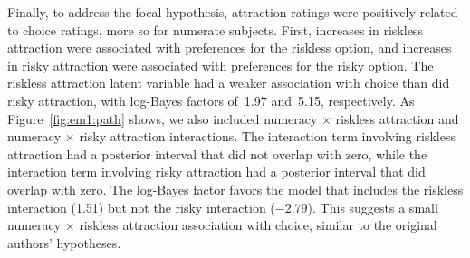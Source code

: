 Finally, to address the focal hypothesis, attraction ratings were positively related to choice ratings, more so for numerate subjects.   First, increases in riskless attraction were associated with preferences for the riskless option, and increases in risky attraction were associated with preferences for the risky option.  The riskless attraction latent variable had a weaker association with choice than did risky attraction, with log-Bayes factors of~1.97 and~5.15, respectively. As Figure~\ref{fig:em1:path} shows, we also included numeracy $\times$ riskless attraction and numeracy $\times$ risky attraction interactions.  The interaction term involving riskless attraction had a posterior interval that did not overlap with zero, while the interaction term involving risky attraction had a posterior interval that did overlap with zero.  The log-Bayes factor favors the model that includes the riskless interaction  (1.51) but not the risky interaction (\ensuremath{-2.79}).  This suggests a small numeracy  $\times$ riskless attraction association with choice, similar to the original authors' hypotheses.  

